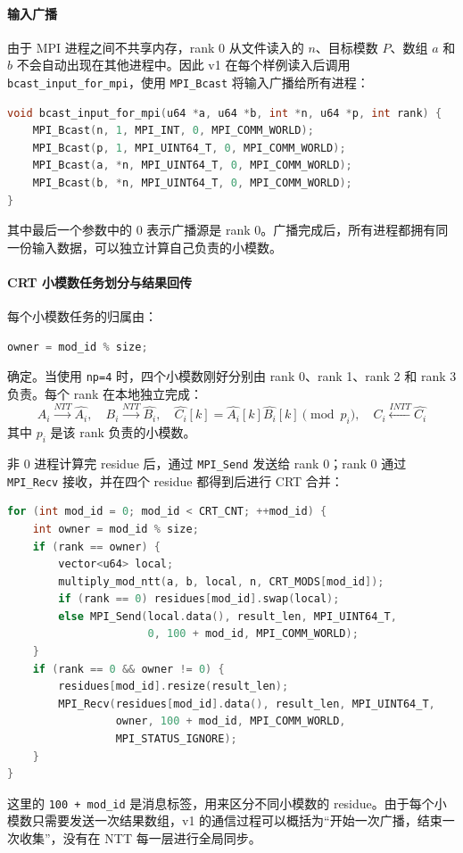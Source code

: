 \documentclass[a4paper]{article}
\begin{document}
\paragraph{输入广播}

由于 MPI 进程之间不共享内存，rank 0 从文件读入的 $n$、目标模数 $P$、数组 $a$ 和 $b$ 不会自动出现在其他进程中。因此 v1 在每个样例读入后调用 \texttt{bcast\_input\_for\_mpi}，使用 \texttt{MPI\_Bcast} 将输入广播给所有进程：
\begin{lstlisting}[language=C++,title=v1 的输入广播]
void bcast_input_for_mpi(u64 *a, u64 *b, int *n, u64 *p, int rank) {
    MPI_Bcast(n, 1, MPI_INT, 0, MPI_COMM_WORLD);
    MPI_Bcast(p, 1, MPI_UINT64_T, 0, MPI_COMM_WORLD);
    MPI_Bcast(a, *n, MPI_UINT64_T, 0, MPI_COMM_WORLD);
    MPI_Bcast(b, *n, MPI_UINT64_T, 0, MPI_COMM_WORLD);
}
\end{lstlisting}
其中最后一个参数中的 0 表示广播源是 rank 0。广播完成后，所有进程都拥有同一份输入数据，可以独立计算自己负责的小模数。

\paragraph{CRT 小模数任务划分与结果回传}

每个小模数任务的归属由：
\begin{lstlisting}[language=C++]
owner = mod_id % size;
\end{lstlisting}
确定。当使用 \texttt{np=4} 时，四个小模数刚好分别由 rank 0、rank 1、rank 2 和 rank 3 负责。每个 rank 在本地独立完成：
\[
A_i \xrightarrow{NTT} \hat{A_i},\quad
B_i \xrightarrow{NTT} \hat{B_i},\quad
\hat{C_i}[k]=\hat{A_i}[k]\hat{B_i}[k]\pmod {p_i},\quad
C_i \xleftarrow{INTT} \hat{C_i}
\]
其中 $p_i$ 是该 rank 负责的小模数。

非 0 进程计算完 residue 后，通过 \texttt{MPI\_Send} 发送给 rank 0；rank 0 通过 \texttt{MPI\_Recv} 接收，并在四个 residue 都得到后进行 CRT 合并：
\begin{lstlisting}[language=C++,title=v1 的 CRT 模数级 MPI 通信]
for (int mod_id = 0; mod_id < CRT_CNT; ++mod_id) {
    int owner = mod_id % size;
    if (rank == owner) {
        vector<u64> local;
        multiply_mod_ntt(a, b, local, n, CRT_MODS[mod_id]);
        if (rank == 0) residues[mod_id].swap(local);
        else MPI_Send(local.data(), result_len, MPI_UINT64_T,
                      0, 100 + mod_id, MPI_COMM_WORLD);
    }
    if (rank == 0 && owner != 0) {
        residues[mod_id].resize(result_len);
        MPI_Recv(residues[mod_id].data(), result_len, MPI_UINT64_T,
                 owner, 100 + mod_id, MPI_COMM_WORLD,
                 MPI_STATUS_IGNORE);
    }
}
\end{lstlisting}
这里的 \texttt{100 + mod\_id} 是消息标签，用来区分不同小模数的 residue。由于每个小模数只需要发送一次结果数组，v1 的通信过程可以概括为“开始一次广播，结束一次收集”，没有在 NTT 每一层进行全局同步。
\end{document}
